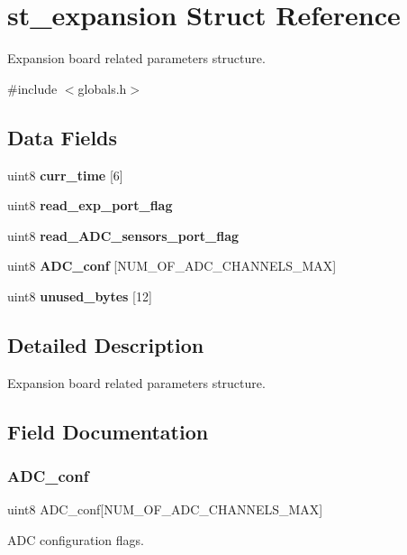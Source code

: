 \section{st\+\_\+expansion Struct Reference}
\label{structst__expansion}


Expansion board related parameters structure.  




{\ttfamily \#include $<$globals.\+h$>$}

\subsection*{Data Fields}
\begin{DoxyCompactItemize}
\item 
uint8 \textbf{ curr\+\_\+time} [6]
\item 
uint8 \textbf{ read\+\_\+exp\+\_\+port\+\_\+flag}
\item 
uint8 \textbf{ read\+\_\+\+A\+D\+C\+\_\+sensors\+\_\+port\+\_\+flag}
\item 
uint8 \textbf{ A\+D\+C\+\_\+conf} [N\+U\+M\+\_\+\+O\+F\+\_\+\+A\+D\+C\+\_\+\+C\+H\+A\+N\+N\+E\+L\+S\+\_\+\+M\+AX]
\item 
uint8 \textbf{ unused\+\_\+bytes} [12]
\end{DoxyCompactItemize}


\subsection{Detailed Description}
Expansion board related parameters structure. 



\subsection{Field Documentation}
\mbox{\label{structst__expansion_ae9f8f466e488103ced67140d2d14216d}} 
\subsubsection{A\+D\+C\+\_\+conf}
{\footnotesize\ttfamily uint8 A\+D\+C\+\_\+conf[N\+U\+M\+\_\+\+O\+F\+\_\+\+A\+D\+C\+\_\+\+C\+H\+A\+N\+N\+E\+L\+S\+\_\+\+M\+AX]}

A\+DC configuration flags. \mbox{\label{structst__expansion_aa7a2bcba81fd34156b7cb457ef4776dc}} 

